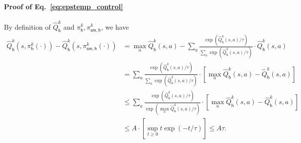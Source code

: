 \documentclass[10pt]{article}
\newcommand{\<}{\left\langle}
\renewcommand{\>}{\right\rangle}
\newcommand{\temp}{{\tau}}
\newcommand{\state}{{s}}
\newcommand{\action}{{a}}
\newcommand{\plc}{{\pi}}
\newcommand{\Numact}{{A}}
\newcommand{\Qfun}{{Q}}
\newcommand{\trestQfun}{{\widehat{\Qfun}}}
\newcommand{\s}{{\mathsf{sm}}}
\def\sh{{\mathsf{h}}}
\begin{document}
 \paragraph{Proof of Eq.~\eqref{eq:epstemp_control}}
 By definition of $\trestQfun_\sh^k$ and $\plc_\sh^k,\plc^k_{\s,\sh}$, we have
 \begin{align*}
     \trestQfun^k_\sh(\state,\plc^k_{\sh}(\cdot))-\trestQfun^k_\sh(\state,\plc^k_{\s,\sh}(\cdot)) &=\max_{\action} \trestQfun^k_\sh(\state,\action)-
\sum_{\action}\frac{\exp(\trestQfun^k_\sh(\state,\action)/\temp)}{\sum_\action \exp(\trestQfun^k_\sh(\state,\action)/\temp)}\cdot\trestQfun^k_\sh(\state,\action)\\
&=
\sum_{\action}\frac{\exp(\trestQfun^k_\sh(\state,\action)/\temp)}{\sum_\action \exp(\trestQfun^k_\sh(\state,\action)/\temp)}\cdot[\max_{\action} \trestQfun^k_\sh(\state,\action)-\trestQfun^k_\sh(\state,\action)]\\
&\leq
\sum_{\action}\frac{\exp(\trestQfun^k_\sh(\state,\action)/\temp)}{ \exp(\max_\action\trestQfun^k_\sh(\state,\action)/\temp)}\cdot[\max_{\action} \trestQfun^k_\sh(\state,\action)-\trestQfun^k_\sh(\state,\action)]\\
&\leq \Numact \cdot [\sup_{t\geq 0}t\exp(-t/\temp)]\leq\Numact\temp.
 \end{align*}
\end{document}
